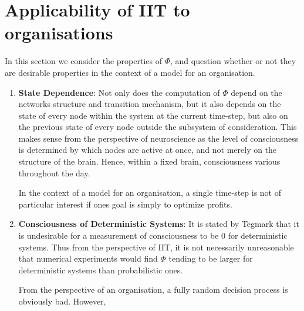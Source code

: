 \section{Applicability of IIT to organisations}
In this section we consider the properties of $\Phi$, and question whether or not they are desirable properties in the context of a model for an organisation.

\begin{enumerate}
	\item \textbf{State Dependence}: Not only does the computation of $\Phi$ depend on the networks structure and transition mechanism, but it also depends on the state of every node within the system at the current time-step, but also on the previous state of every node outside the subsystem of consideration. This makes sense from the perspective of neuroscience as the level of consciousness is determined by which nodes are active at once, and not merely on the structure of the brain. Hence, within a fixed brain, consciousness various throughout the day. 
	
	In the context of a model for an organisation, a single time-step is not of particular interest if ones goal is simply to optimize profits. 
	
	
	\item \textbf{Consciousness of Deterministic Systems}: It is stated by Tegmark \cite{improvedIIT} that it is undesirable for a measurement of consciousness to be 0 for deterministic systems. Thus from the perspective of IIT, it is not necessarily unreasonable that numerical experiments would find $\Phi$ tending to be larger for deterministic systems than probabilistic ones.
	
	From the perspective of an organisation, a fully random decision process is obviously bad. However, 
\end{enumerate}